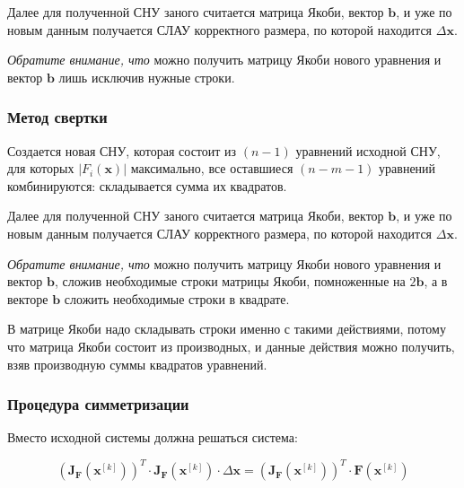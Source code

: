\documentclass[12pt, a4paper]{article}
\newcommand{\roubr}[1]{\left(#1\right)}
\begin{document}
Далее для полученной СНУ заного считается матрица Якоби, вектор $\mathbf{b}$, и уже по новым данным получается СЛАУ корректного размера, по которой находится $\Delta \mathbf{x}$.

\textit{Обратите внимание, что} можно получить матрицу Якоби нового уравнения и вектор $\mathbf{b}$ лишь исключив нужные строки.

\subsubsection{Метод свертки}

Создается новая СНУ, которая состоит из $(n-1)$ уравнений исходной СНУ, для которых $|F_i(\mathbf{x})|$ максимально, все оставшиеся $(n-m-1)$ уравнений комбинируются: складывается сумма их квадратов.

Далее для полученной СНУ заного считается матрица Якоби, вектор $\mathbf{b}$, и уже по новым данным получается СЛАУ корректного размера, по которой находится $\Delta \mathbf{x}$.

\textit{Обратите внимание, что} можно получить матрицу Якоби нового уравнения и вектор $\mathbf{b}$, сложив необходимые строки матрицы Якоби, помноженные на $2\mathbf{b}$, а в векторе $\mathbf{b}$ сложить необходимые строки в квадрате. 

В матрице Якоби надо складывать строки именно с такими действиями, потому что матрица Якоби состоит из производных, и данные действия можно получить, взяв производную суммы квадратов уравнений.

\subsubsection{Процедура симметризации}

Вместо исходной системы должна решаться система:

$$\roubr{\mathbf{J}_\mathbf{F}\roubr{\mathbf{x}^{[k]}}}^T \cdot \mathbf{J}_\mathbf{F}\roubr{\mathbf{x}^{[k]}} \cdot \Delta \mathbf{x} = \roubr{\mathbf{J}_\mathbf{F}\roubr{\mathbf{x}^{[k]}}}^T \cdot \mathbf{F}\roubr{\mathbf{x}^{[k]}} $$
\end{document}
